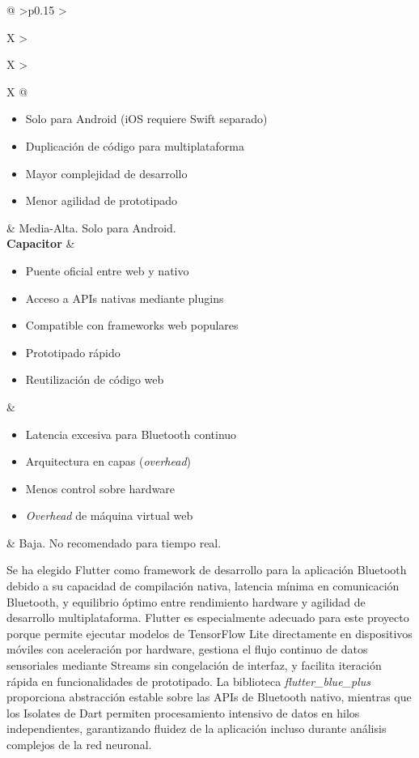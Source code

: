 \begin{xltabular}{\textwidth}{@{} >{\centering\arraybackslash}p{0.15\textwidth} >{\raggedright\arraybackslash}X >{\raggedright\arraybackslash}X >{\raggedright\arraybackslash}X @{}}
	\begin{itemize}[nosep] \item Solo para Android (iOS requiere Swift separado) \item Duplicación de código para multiplataforma \item Mayor complejidad de desarrollo \item Menor agilidad de prototipado \end{itemize} &
	Media-Alta. Solo para Android. \\
	\midrule
	\textbf{Capacitor} &
	\begin{itemize}[nosep] \item Puente oficial entre web y nativo \item Acceso a APIs nativas mediante plugins \item Compatible con frameworks web populares \item Prototipado rápido \item Reutilización de código web \end{itemize} &
	\begin{itemize}[nosep] \item Latencia excesiva para Bluetooth continuo \item Arquitectura en capas (\textit{overhead}) \item Menos control sobre hardware \item \textit{Overhead} de máquina virtual web \end{itemize} &
	Baja. No recomendado para tiempo real. \\
\end{xltabular}
{\captionsetup{type=table,hypcap=false}\label{tab:comparativa_herramientas_bluetooth}}

\normalsize

Se ha elegido Flutter como framework de desarrollo para la aplicación Bluetooth debido a su capacidad de compilación nativa, latencia mínima en comunicación Bluetooth, y equilibrio óptimo entre rendimiento hardware y agilidad de desarrollo multiplataforma. Flutter es especialmente adecuado para este proyecto porque permite ejecutar modelos de TensorFlow Lite directamente en dispositivos móviles con aceleración por hardware, gestiona el flujo continuo de datos sensoriales mediante Streams sin congelación de interfaz, y facilita iteración rápida en funcionalidades de prototipado. La biblioteca \textit{flutter\_blue\_plus} proporciona abstracción estable sobre las APIs de Bluetooth nativo, mientras que los Isolates de Dart permiten procesamiento intensivo de datos en hilos independientes, garantizando fluidez de la aplicación incluso durante análisis complejos de la red neuronal.